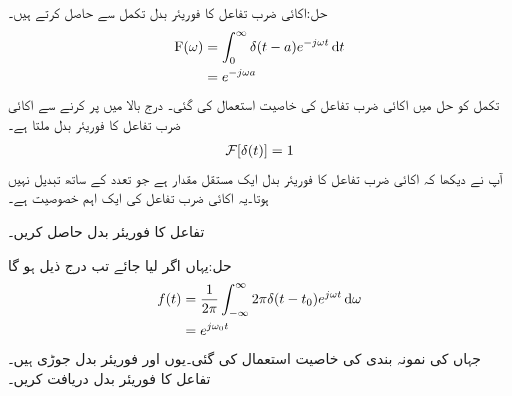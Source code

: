حل:اکائی ضرب تفاعل کا فوریئر بدل تکمل سے حاصل کرتے ہیں۔
\begin{gather}
\begin{aligned}
\bF(\omega)&=\int_0^{\infty} \delta(t-a)e^{-j\omega t} \dif t\\
&=e^{-j\omega a}
\end{aligned}
\end{gather}
تکمل کو حل میں اکائی ضرب تفاعل کی  خاصیت استعمال کی گئی۔ درج بالا میں  پر کرنے سے اکائی ضرب تفاعل  کا فوریئر بدل ملتا ہے۔
\begin{align}
\mathcal{F}[\delta(t)]=1
\end{align}
آپ نے دیکھا کہ اکائی ضرب تفاعل  کا فوریئر بدل ایک مستقل مقدار ہے جو تعدد کے ساتھ تبدیل نہیں ہوتا۔یہ اکائی ضرب تفاعل کی ایک اہم خصوصیت ہے۔
 
تفاعل  کا فوریئر بدل حاصل کریں۔

حل:یہاں اگر  لیا جائے تب  درج ذیل ہو گا
\begin{gather}
\begin{aligned}
f(t)&=\frac{1}{2\pi}\int_{-\infty}^{\infty} 2\pi \delta(t-t_0)e^{j\omega t}\dif \omega\\
&=e^{j\omega_0 t}
\end{aligned}
\end{gather} 
جہاں  کی نمونہ بندی کی خاصیت استعمال کی گئی۔یوں  اور  فوریئر بدل جوڑی ہیں۔ 
تفاعل  کا فوریئر بدل دریافت کریں۔

